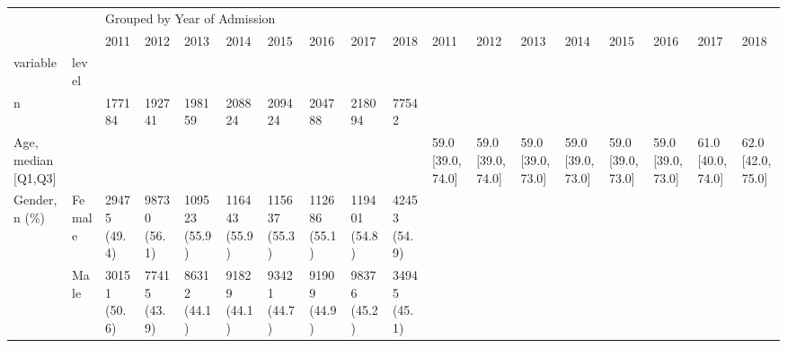 \begin{tabular}{llllllllllllllllll}
\toprule
                                       &   & \multicolumn{16}{l}{Grouped by Year of Admission} \\
                                       &   &                         2011 &            2012 &            2013 &            2014 &            2015 &            2016 &            2017 &           2018 &              2011 &               2012 &               2013 &               2014 &               2015 &                2016 &                2017 &                2018 \\
variable & level &                              &                 &                 &                 &                 &                 &                 &                &                   &                    &                    &                    &                    &                     &                     &                     \\
\midrule
n &   &                       177184 &          192741 &          198159 &          208824 &          209424 &          204788 &          218094 &          77542 &                   &                    &                    &                    &                    &                     &                     &                     \\
Age, median [Q1,Q3] &   &                              &                 &                 &                 &                 &                 &                 &                &  59.0 [39.0,74.0] &   59.0 [39.0,74.0] &   59.0 [39.0,73.0] &   59.0 [39.0,73.0] &   59.0 [39.0,73.0] &    59.0 [39.0,73.0] &    61.0 [40.0,74.0] &    62.0 [42.0,75.0] \\
Gender, n (\%) & Female &                 29475 (49.4) &    98730 (56.1) &   109523 (55.9) &   116443 (55.9) &   115637 (55.3) &   112686 (55.1) &   119401 (54.8) &   42453 (54.9) &                   &                    &                    &                    &                    &                     &                     &                     \\
                                       & Male &                 30151 (50.6) &    77415 (43.9) &    86312 (44.1) &    91829 (44.1) &    93421 (44.7) &    91909 (44.9) &    98376 (45.2) &   34945 (45.1) &                   &                    &                    &                    &                    &                     &                     &                     \\

\end{tabular}
